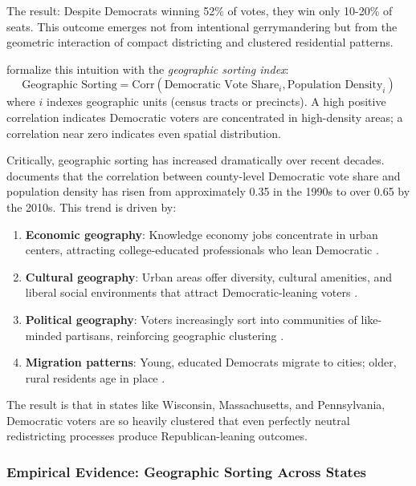 The result: Despite Democrats winning 52\% of votes, they win only 10-20\% of seats. This outcome emerges not from intentional gerrymandering but from the geometric interaction of compact districting and clustered residential patterns.

\citet{chen2013} formalize this intuition with the \textit{geographic sorting index}:
\begin{equation}
\text{Geographic Sorting} = \text{Corr}(\text{Democratic Vote Share}_i, \text{Population Density}_i)
\end{equation}
where $i$ indexes geographic units (census tracts or precincts). A high positive correlation indicates Democratic voters are concentrated in high-density areas; a correlation near zero indicates even spatial distribution.

Critically, geographic sorting has increased dramatically over recent decades. \citet{rodden2019} documents that the correlation between county-level Democratic vote share and population density has risen from approximately 0.35 in the 1990s to over 0.65 by the 2010s. This trend is driven by:

\begin{enumerate}
\item \textbf{Economic geography}: Knowledge economy jobs concentrate in urban centers, attracting college-educated professionals who lean Democratic \citep{moretti2012}.
\item \textbf{Cultural geography}: Urban areas offer diversity, cultural amenities, and liberal social environments that attract Democratic-leaning voters \citep{florida2008}.
\item \textbf{Political geography}: Voters increasingly sort into communities of like-minded partisans, reinforcing geographic clustering \citep{bishop2009}.
\item \textbf{Migration patterns}: Young, educated Democrats migrate to cities; older, rural residents age in place \citep{scala2015}.
\end{enumerate}

The result is that in states like Wisconsin, Massachusetts, and Pennsylvania, Democratic voters are so heavily clustered that even perfectly neutral redistricting processes produce Republican-leaning outcomes.

\subsubsection{Empirical Evidence: Geographic Sorting Across States}
\label{sec:sorting_correlation}

